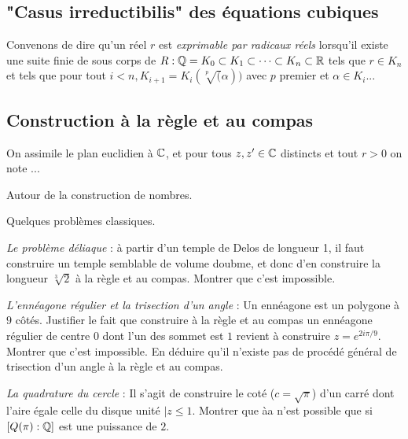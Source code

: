 \documentclass[french]{report}
\begin{document}
\subsection*{"Casus irreductibilis" des équations cubiques}
\begin{exo}
    Convenons de dire qu'un réel \(r\) est \textit{exprimable par radicaux réels} lorsqu'il
    existe une suite finie de sous corps de \(R:\mathbb{Q}=K_0\subset K_1\subset\dots \subset K_n
    \subset \mathbb{R}\) tels que \(r\in K_n\) et tels que pour tout \(i<n, K_{i+1}=K_i(\sqrt[p](\alpha))\)
    avec \(p\) premier et \(\alpha\in K_i\)...
\end{exo}

\subsection*{Construction à la règle et au compas}

On assimile le plan euclidien à \(\mathbb{C}\), et pour tous \(z,z'\in\mathbb{C}\) distincts
et tout \(r>0\) on note ...

\begin{exo}
    Autour de la construction de nombres.
\end{exo}

\begin{exo}
    Quelques problèmes classiques.
    \begin{q}{1}
        \textit{Le problème déliaque} : à partir d'un temple de Delos de longueur 1,
        il faut construire un temple semblable de volume doubme, et donc d'en construire
        la longueur \(\sqrt[3]{2}\) à la règle et au compas. Montrer que c'est impossible.
    \end{q}
    \begin{q}{2}
        \textit{L'ennéagone régulier et la trisection d'un angle} : Un ennéagone est un
        polygone à \(9\) côtés. Justifier le fait que construire à la règle et au
        compas un ennéagone régulier de centre \(0\) dont l'un des sommet est \(1\)
        revient à construire \(z=e^{2i\pi/9}\). Montrer que c'est impossible. En
        déduire qu'il n'existe pas de procédé général de trisection d'un angle à la règle
        et au compas.
    \end{q}
    \begin{q}{3}
        \textit{La quadrature du cercle} : Il s'agit de construire le coté
        (\(c=\sqrt{\pi}\)) d'un carré dont l'aire égale celle du disque unité \(|z\leq 1\).
        Montrer que àa n'est possible que si \([Q(\pi):\mathbb{Q}]\) est une puissance de \(2\).
    \end{q}
\end{exo}
\end{document}
